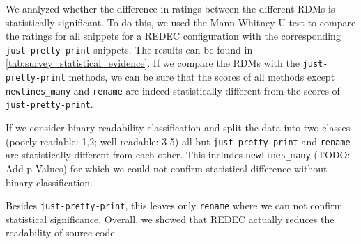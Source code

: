 \documentclass[%
class=scrreprt,
chapterprefix=false,%
open=right,%
twoside=false,%
paper=a4,%
logofile={Logo\_zentral\_farbig\_EN.png},%
thesistype=master,%
UKenglish,%
]{se2thesis}
\theoremstyle{definition}
\newcommand{\rdh}{REDEC\xspace}
\newcommand{\rdhs}{RDMs\xspace}
\newcommand{\none}{just-pretty-print\xspace} %
\newcommand{\nonet}{\texttt{\none}\xspace} %
\begin{document}
	We analyzed whether the difference in ratings between the different \rdhs is statistically significant. To do this, we used the Mann-Whitney U test to compare the ratings for all snippets for a \rdh configuration with the corresponding \nonet snippets. The results can be found in \autoref{tab:survey_statistical_evidence}.
	If we compare the \rdhs with the \nonet methods, we can be sure that the scores of all methods except \texttt{newlines\_many} and \texttt{rename} are indeed statistically different from the scores of \nonet. 
	
	If we consider binary readability classification and split the data into two classes (poorly readable: 1,2; well readable: 3-5) all but \nonet and \texttt{rename} are statistically different from each other. This includes \texttt{newlines\_many} (TODO: Add p Values) for which we could not confirm statistical difference without binary classification.

	Besides \nonet, this leaves only \texttt{rename} where we can not confirm statistical significance. Overall, we showed that \rdh actually reduces the readability of source code.

\end{document}
